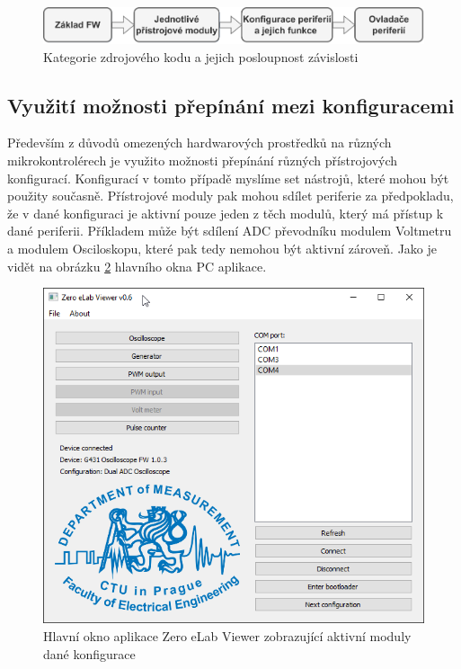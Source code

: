 \begin{figure}[H]
	\centering
	\includegraphics[width=0.9\linewidth]{Figs/Documentation/FW_Zavislosti}
	\caption{Kategorie zdrojového kodu a jejich posloupnost závislosti}
	\label{fig:fwzavislosti}
\end{figure}


\subsection{Využití možnosti přepínání mezi konfiguracemi}
Především z důvodů omezených hardwarových prostředků na různých mikrokontrolérech je využito možnosti přepínání různých přístrojových konfigurací. Konfigurací v tomto případě myslíme set nástrojů, které mohou být použity současně. Přístrojové moduly pak mohou sdílet periferie za předpokladu, že v dané konfiguraci je aktivní pouze jeden z těch modulů, který má přístup k dané periferii. Příkladem může být sdílení ADC převodníku modulem Voltmetru a modulem Osciloskopu, které pak tedy nemohou být aktivní zároveň. Jako je vidět na obrázku \ref{fig:zeroelab} hlavního okna PC aplikace.

\begin{figure}[H]
	\centering
	\includegraphics[width=0.7\linewidth]{Figs/Screenshots/ZeroElab}
	\caption{Hlavní okno aplikace Zero eLab Viewer zobrazující aktivní moduly dané konfigurace}
	\label{fig:zeroelab}
\end{figure}

